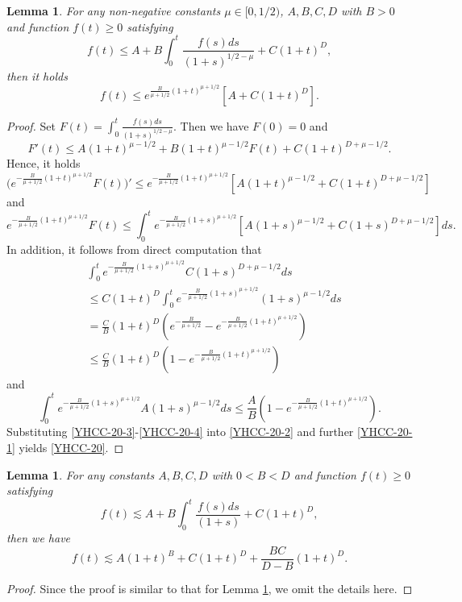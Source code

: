 \documentclass[11pt,twoside]{article}
\def\ds{\displaystyle}
\def\ls{\lesssim}
\theoremstyle{plain}
\newtheorem{lemma}[theorem]{Lemma}
\theoremstyle{definition}
\numberwithin{equation}{section}
\begin{document}
\begin{lemma}\label{lem-Gronwall-1}
For any non-negative constants $\mu\in[0,1/2)$, $A,B,C,D$ with $B>0$ and function $f(t)\ge0$ satisfying
\begin{equation*}
f(t)\le A+B\int_0^t\frac{f(s)ds}{(1+s)^{1/2-\mu}}+C(1+t)^D,
\end{equation*}
then it holds
\begin{equation}\label{YHCC-20}
f(t)\le e^{\frac{B}{\mu+1/2}(1+t)^{\mu+1/2}}[A+C(1+t)^D].
\end{equation}
\end{lemma}
\begin{proof}
Set $\ds F(t)=\int_0^t\frac{f(s)ds}{(1+s)^{1/2-\mu}}$. Then we have $F(0)=0$ and
\begin{equation}\label{YHCC-20-1}
F'(t)\le A(1+t)^{\mu-1/2}+B(1+t)^{\mu-1/2}F(t)+C(1+t)^{D+\mu-1/2}.
\end{equation}
Hence, it holds 
$$\big(e^{-\frac{B}{\mu+1/2}(1+t)^{\mu+1/2}}F(t)\big)'\le e^{-\frac{B}{\mu+1/2}(1+t)^{\mu+1/2}}[A(1+t)^{\mu-1/2}+C(1+t)^{D+\mu-1/2}]$$
and
\begin{equation}\label{YHCC-20-2}
e^{-\frac{B}{\mu+1/2}(1+t)^{\mu+1/2}}F(t)\le\int_0^t e^{-\frac{B}{\mu+1/2}(1+s)^{\mu+1/2}}[A(1+s)^{\mu-1/2}+C(1+s)^{D+\mu-1/2}]ds.
\end{equation}
In addition, it follows from direct computation that
\begin{equation}\label{YHCC-20-3}
\begin{split}
&\int_0^t e^{-\frac{B}{\mu+1/2}(1+s)^{\mu+1/2}}C(1+s)^{D+\mu-1/2}ds\\
&\le C(1+t)^D\int_0^t e^{-\frac{B}{\mu+1/2}(1+s)^{\mu+1/2}}(1+s)^{\mu-1/2}ds\\
&=\frac{C}{B}(1+t)^D(e^{-\frac{B}{\mu+1/2}}-e^{-\frac{B}{\mu+1/2}(1+t)^{\mu+1/2}})\\
&\le\frac{C}{B}(1+t)^D(1-e^{-\frac{B}{\mu+1/2}(1+t)^{\mu+1/2}})
\end{split}
\end{equation}
and
\begin{equation}\label{YHCC-20-4}
\int_0^t e^{-\frac{B}{\mu+1/2}(1+s)^{\mu+1/2}}A(1+s)^{\mu-1/2}ds\le\frac{A}{B}(1-e^{-\frac{B}{\mu+1/2}(1+t)^{\mu+1/2}}).
\end{equation}
Substituting \eqref{YHCC-20-3}-\eqref{YHCC-20-4} into \eqref{YHCC-20-2} and further \eqref{YHCC-20-1} yields \eqref{YHCC-20}.
\end{proof}


\begin{lemma}\label{lem-Gronwall-2}
For any constants $A,B,C,D$ with $0<B<D$ and function $f(t)\ge0$ satisfying
\begin{equation*}
f(t)\ls A+B\int_0^t\frac{f(s)ds}{(1+s)}+C(1+t)^D,
\end{equation*}
then we have
\begin{equation*}
f(t)\ls A(1+t)^B+C(1+t)^D+\frac{BC}{D-B}(1+t)^D.
\end{equation*}
\end{lemma}
\begin{proof}
Since the proof is similar to that for Lemma \ref{lem-Gronwall-1}, we omit the details here.
\end{proof}
\end{document}
